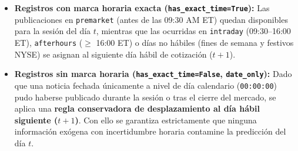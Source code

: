 \begin{itemize}
    \item \textbf{Registros con marca horaria exacta (\texttt{has\_exact\_time=True}):} Las publicaciones en \texttt{premarket} (antes de las 09:30 AM ET) quedan disponibles para la sesión del día $t$, mientras que las ocurridas en \texttt{intraday} (09:30--16:00 ET), \texttt{afterhours} ($\ge$ 16:00 ET) o días no hábiles (fines de semana y festivos NYSE) se asignan al siguiente día hábil de cotización ($t+1$).
    \item \textbf{Registros sin marca horaria (\texttt{has\_exact\_time=False}, \texttt{date\_only}):} Dado que una noticia fechada únicamente a nivel de día calendario (\texttt{00:00:00}) pudo haberse publicado durante la sesión o tras el cierre del mercado, se aplica una \textbf{regla conservadora de desplazamiento al día hábil siguiente ($t+1$)}. Con ello se garantiza estrictamente que ninguna información exógena con incertidumbre horaria contamine la predicción del día $t$.
\end{itemize}
